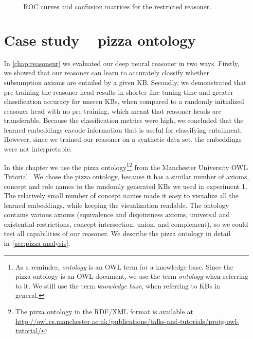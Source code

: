 \begin{figure}[h!]
\centering
\caption{
ROC curves and confusion matrices for the restricted reasoner.
}
\label{fig:ex2-vs}
\end{figure}


\chapter{Case study -- pizza ontology}
\label{chap:casestudy}

In \autoref{chap:reasoneur} we evaluated our deep neural reasoner in two ways.
Firstly, we showed that our reasoner can learn to accurately classify whether subsumption axioms are entailed by a given KB.
Secondly, we demonstrated that pre-training the reasoner head results in shorter fine-tuning time and greater classification accuracy for unseen KBs, when compared to a randomly initialized reasoner head with no pre-training, which meant that reasoner heads are transferable.
Because the classification metrics were high, we concluded that the learned embeddings encode information that is useful for classifying entailment.
However, since we trained our reasoner on a synthetic data set, the embeddings were not interpretable.

In this chapter we use the pizza ontology\footnote{As a reminder, \emph{ontology} is an OWL term for a knowledge base. Since the pizza ontology is an OWL document, we use the term \emph{ontology} when referring to it. We still use the term \emph{knowledge base}, when referring to KBs in general.}\footnote{The pizza ontology in the RDF/XML format is available at \url{http://owl.cs.manchester.ac.uk/publications/talks-and-tutorials/protg-owl-tutorial/}} from the Manchester University OWL Tutorial~\cite{horridge_practical_2011}
We chose the pizza ontology, because it has a similar number of axioms, concept and role names to the randomly generated KBs we used in experiment 1.
The relatively small number of concept names made it easy to visualize all the learned embeddings, while keeping the visualization readable.
The ontology contains various axioms (equivalence and disjointness axioms, universal and existential restrictions, concept intersection, union, and complement), so we could test all capabilities of our reasoner.
We describe the pizza ontology in detail in~\autoref{sec:pizza-analysis}.

